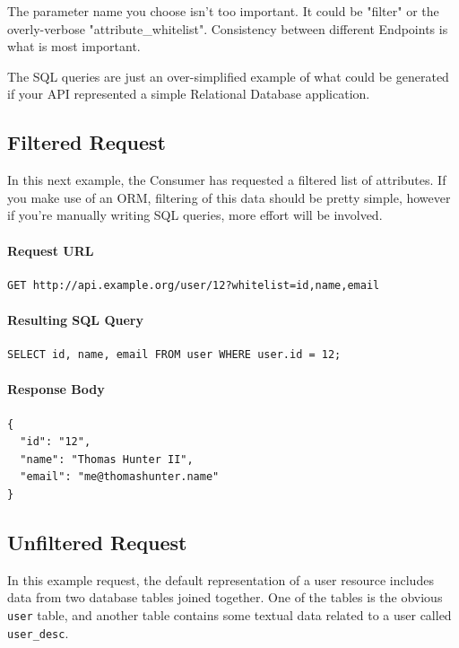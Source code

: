 \documentclass{book}
\begin{document}
The parameter name you choose isn't too important. It could be "filter" or the overly-verbose "attribute\_whitelist". Consistency between different Endpoints is what is most important.

The SQL queries are just an over-simplified example of what could be generated if your API represented a simple Relational Database application.

\subsection{Filtered Request}

In this next example, the Consumer has requested a filtered list of attributes. If you make use of an ORM, filtering of this data should be pretty simple, however if you're manually writing SQL queries, more effort will be involved.

\paragraph{\textbf{Request URL}}

\begin{verbatim}
GET http://api.example.org/user/12?whitelist=id,name,email
\end{verbatim}

\paragraph{\textbf{Resulting SQL Query}}

\begin{verbatim}
SELECT id, name, email FROM user WHERE user.id = 12;
\end{verbatim}

\paragraph{\textbf{Response Body}}

\begin{verbatim}
{
  "id": "12",
  "name": "Thomas Hunter II",
  "email": "me@thomashunter.name"
}
\end{verbatim}

\subsection{Unfiltered Request}

In this example request, the default representation of a user resource includes data from two database tables joined together. One of the tables is the obvious \texttt{user} table, and another table contains some textual data related to a user called \texttt{user\_desc}.
\end{document}
